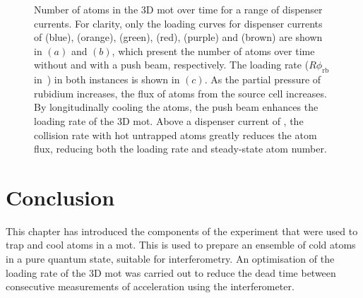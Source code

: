 \begin{figure}
	\caption[3D \ac{mot} atom number vs dispenser current with and without a push beam.]{Number of atoms in the 3D \ac{mot} over time for a range of dispenser
currents. For clarity, only the loading curves for dispenser currents of
 (blue),
(orange),  (green), 
(red),  (purple) and  (brown) are
shown in \((a)\) and \((b)\), which present the number of atoms over time
without and with a push beam, respectively. The loading rate (\(R \phi_\text{rb}\) in~) in both instances is
shown in \((c)\). As the partial pressure of rubidium increases, the flux of atoms from the source cell increases. By longitudinally cooling the atoms, the push beam enhances
the loading rate of the 3D \ac{mot}. Above a dispenser current of
, the collision rate with hot untrapped atoms greatly reduces the atom flux, reducing both the loading rate and steady-state atom number.}
\label{fig:loading_plots} 
\end{figure} 

\section{Conclusion}
This chapter has introduced the components of the experiment that were used to trap and cool atoms in a \ac{mot}. This is used to prepare an ensemble of cold atoms in a pure quantum state, suitable for interferometry. An optimisation of the loading rate of the 3D \ac{mot} was carried out to reduce the dead time between consecutive measurements of acceleration using the interferometer. 